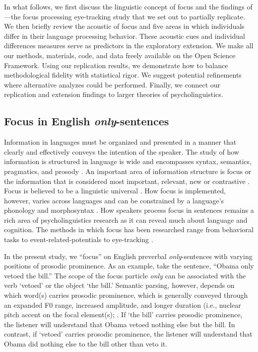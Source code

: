 In what follows, we first discuss the linguistic concept of focus and the findings of \cite{Ge2021}---the focus processing eye-tracking study that we set out to partially replicate. We then briefly review the acoustic of focus and five areas in which individuals differ in their language processing behavior. These acoustic cues and individual differences measures serve as predictors in the exploratory extension. We make all our methods, materials, code, and data freely available on the Open Science Framework. Using our \cite{Ge2021} replication results, we demonstrate how to balance methodological fidelity with statistical rigor. We suggest potential refinements where alternative analyzes could be performed. Finally, we connect our replication and extension findings to larger theories of psycholinguistics. 

\subsection{Focus in English \textit{only}-sentences}

Information in languages must be organized and presented in a manner that clearly and effectively conveys the intention of the speaker. The study of how information is structured in language is wide and encompasses syntax, semantics, pragmatics, and prosody \citep[see ][] {Breen2010, Lambrecht1994, Roberts2012}. An important area of information structure is focus or the information that is considered most important, relevant, new or contrastive \citep{Kiss1998}. Focus is believed to be a linguistic universal \citep{Comrie1989}. How focus is implemented, however, varies across languages and can be constrained by a language’s phonology and morphosyntax \citep{Kiss1998, Lambrecht1994}. How speakers process focus in sentences remains a rich area of psycholinguistics research as it can reveal much about language and cognition. The methods in which focus has been researched range from behavioral tasks \citep[e.g.,][] {Cutler1979, Paterson1999} to event-related-potentials \citep[e.g.,][] {Chen2014, Wang2011} to eye-tracking \citep[e.g.,][] {Filik2005, Hohle2016}.

In the present study, we “focus” on English preverbal \textit{only}-sentences with varying positions of prosodic prominence. As an example, take the sentence, “Obama only vetoed the bill.” The scope of the focus particle \textit{only} can be associated with the verb ‘vetoed’ or the object ‘the bill.’ Semantic parsing, however, depends on which word(s) carries prosodic prominence, which is generally conveyed through an expanded F0 range, increased amplitude, and longer duration (i.e., nuclear pitch accent on the focal element(s); \citep{Breen2010, Gussenhoven1983}.  If ‘the bill’ carries prosodic prominence, the listener will understand that Obama vetoed nothing else but the bill. In contrast, if ‘vetoed’ carries prosodic prominence, the listener will understand that Obama did nothing else to the bill other than veto it. 

